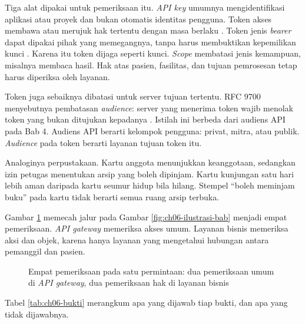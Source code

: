 Tiga alat dipakai untuk pemeriksaan itu. \textit{API key} umumnya mengidentifikasi aplikasi atau proyek dan bukan
otomatis identitas pengguna. Token akses membawa atau merujuk hak tertentu dengan masa berlaku \cite{rfc6749}.
Token jenis \textit{bearer} dapat dipakai pihak yang memegangnya, tanpa harus membuktikan kepemilikan kunci
\cite{c06-rfc6750}. Karena itu token dijaga seperti kunci. \textit{Scope} membatasi jenis kemampuan,
misalnya membaca hasil. Hak atas pasien, fasilitas, dan tujuan pemrosesan tetap harus diperiksa oleh layanan.

Token juga sebaiknya dibatasi untuk server tujuan tertentu. RFC 9700 menyebutnya pembatasan \textit{audience}: server
yang menerima token wajib menolak token yang bukan ditujukan kepadanya \cite{rfc9700}. Istilah ini berbeda dari
audiens API pada Bab 4. Audiens API berarti kelompok pengguna: privat, mitra, atau publik. \textit{Audience} pada token
berarti layanan tujuan token itu.

Analoginya perpustakaan. Kartu anggota menunjukkan keanggotaan, sedangkan izin petugas menentukan arsip yang boleh
dipinjam. Kartu kunjungan satu hari lebih aman daripada kartu seumur hidup bila hilang. Stempel ``boleh meminjam buku''
pada kartu tidak berarti semua ruang arsip terbuka.

Gambar \ref{fig:ch06-lapis-pemeriksaan} memecah jalur pada Gambar \ref{fig:ch06-ilustrasi-bab} menjadi empat
pemeriksaan. \textit{API gateway} memeriksa akses umum. Layanan bisnis memeriksa aksi dan objek, karena hanya layanan
yang mengetahui hubungan antara pemanggil dan pasien.

\begin{figure}[!htb]
  \centering
  
  \caption{Empat pemeriksaan pada satu permintaan: dua pemeriksaan umum di \textit{API gateway}, dua pemeriksaan hak di layanan bisnis}
  \label{fig:ch06-lapis-pemeriksaan}
\end{figure}

Tabel \ref{tab:ch06-bukti} merangkum apa yang dijawab tiap bukti, dan apa yang tidak dijawabnya.

